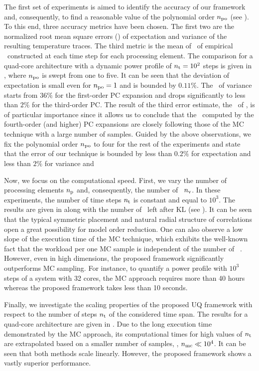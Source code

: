
The first set of experiments is aimed to identify the accuracy of our framework and, consequently, to find a reasonable value of the polynomial order ${n_\text{po}}$ (see ). To this end, three accuracy metrics have been chosen. The first two are the normalized root mean square errors (\nrmses) of expectation and variance of the resulting temperature traces. The third metric is the mean of \nrmses\ of empirical \pdfs\ constructed at each time step for each processing element. The comparison for a quad-core architecture with a dynamic power profile of ${n_\text{t}} = 10^2$ steps is given in , where ${n_\text{po}}$ is swept from one to five. It can be seen that the deviation of expectation is small even for ${n_\text{po}} = 1$ and is bounded by $0.11\%$. The \nrmse\ of variance starts from $36\%$ for the first-order PC expansion and drops significantly to less than $2\%$ for the third-order PC. The result of the third error estimate, the \nrmses\ of \pdfs, is of particular importance since it allows us to conclude that the \pdfs\ computed by the fourth-order (and higher) PC expansions are closely following those of the MC technique with a large number of samples. Guided by the above observations, we fix the polynomial order ${n_\text{po}}$ to four for the rest of the experiments and state that the error of our technique is bounded by less than $0.2\%$ for expectation and less than $2\%$ for variance and \pdf


Now, we focus on the computational speed. First, we vary the number of processing elements ${n_\text{p}}$ and, consequently, the number of \rvs\ ${n_\text{v}}$. In these experiments, the number of time steps ${n_\text{t}}$ is constant and equal to $10^3$. The results are given in  along with the number of \rvs\ left after KL (see ). It can be seen that the typical symmetric placement and natural radial structure of correlations \cite{cheng2011} open a great possibility for model order reduction. One can also observe a low slope of the execution time of the MC technique, which exhibits the well-known fact that the workload per one MC sample is independent of the number of \rvs\ \cite{maitre2010}. However, even in high dimensions, the proposed framework significantly outperforms MC sampling. For instance, to quantify a power profile with $10^3$ steps of a system with 32 cores, the MC approach requires more than 40 hours whereas the proposed framework takes less than 10 seconds.

Finally, we investigate the scaling properties of the proposed UQ framework with respect to the number of steps ${n_\text{t}}$ of the considered time span. The results for a quad-core architecture are given in . Due to the long execution time demonstrated by the MC approach, its computational times for high values of ${n_\text{t}}$ are extrapolated based on a smaller number of samples, \ie, ${n_\text{mc}} \ll 10^4$. It can be seen that both methods scale linearly. However, the proposed framework shows a vastly superior performance.
